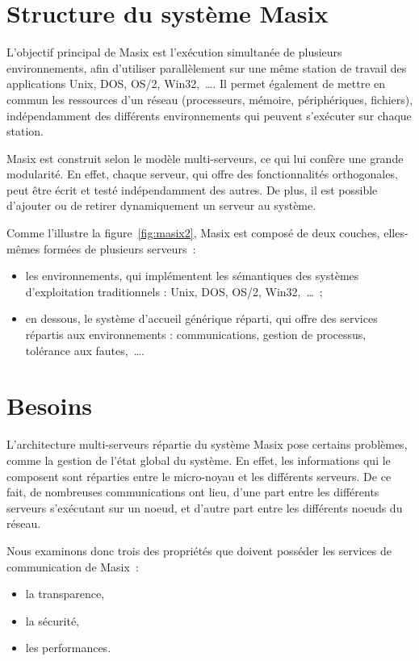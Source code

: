 \section{Structure du syst\`eme Masix}

L'objectif principal de Masix est l'ex\'ecution simultan\'ee de plusieurs 
environnements, afin d'utiliser parall\`element sur une m\^eme station 
de travail des applications Unix, DOS, OS/2, Win32,~\dots. 
Il permet \'egalement de mettre en commun les ressources d'un r\'eseau 
(processeurs, m\'emoire, p\'eriph\'eriques, fichiers), 
ind\'ependamment des diff\'erents environnements qui peuvent s'ex\'ecuter
sur chaque station.

Masix est construit selon le mod\`ele multi-serveurs, ce qui lui conf\`ere une 
grande modularit\'e. En effet, chaque serveur, qui offre des fonctionnalit\'es 
orthogonales, peut \^etre \'ecrit et test\'e ind\'ependamment des autres.
De plus, il est possible d'ajouter ou de retirer dynamiquement un serveur 
au syst\`eme.

Comme l'illustre la figure~\ref{fig:masix2}, Masix est compos\'e de deux couches, elles-m\^emes form\'ees de plusieurs serveurs~:
\begin{itemize}
\item les environnements, qui impl\'ementent les s\'eman\-tiques des 
syst\`emes d'exploitation traditionnels : Unix, DOS, OS/2, Win32,~\dots~;
\item en dessous, le syst\`eme d'accueil g\'en\'erique r\'eparti, 
qui offre des services r\'epartis aux environnements : communications, gestion de processus, tol\'erance aux fautes,~\dots.
\end{itemize}


\section{Besoins}

L'architecture multi-serveurs r\'epartie du syst\`eme Masix pose 
certains probl\`emes, comme la gestion de l'\'etat global du syst\`eme. 
En effet, les informations qui le composent sont r\'eparties entre 
le micro-noyau et les diff\'erents serveurs. De ce fait, de nombreuses 
communications ont lieu, d'une part entre les diff\'erents serveurs 
s'ex\'ecutant sur un noeud, et d'autre part entre les diff\'erents noeuds 
du r\'eseau. 

Nous examinons donc trois des propri\'et\'es que doivent poss\'eder les services de
 communication de Masix~:
\begin{itemize}
\item la transparence,
\item la s\'ecurit\'e,
\item les performances.
\end{itemize}

